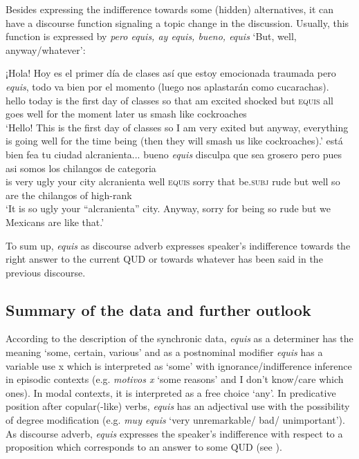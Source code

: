 \documentclass[output=paper]{langsci/langscibook}
\begin{document}
Besides expressing the indifference towards some (hidden) alternatives, it can have a discourse function signaling a topic change in the discussion. Usually, this function is expressed by \textit{pero equis, ay equis, bueno, equis} ‘But, well, anyway/whatever’:

\ea\label{ex:kellert:34}
\gll ¡Hola! Hoy es el primer día de clases así que estoy emocionada traumada pero \textit{equis}, todo va bien por el momento (luego nos aplastarán como cucarachas).\\
hello today is the first day of classes so that am excited shocked but \textsc{equis} all goes well for the moment later us smash like cockroaches\\
\glt ‘Hello! This is the first day of classes so I am very exited but anyway, everything is going well for the time being (then they will smash us like cockroaches).’
\ex 
\gll está bien fea tu ciudad alcranienta... bueno \textit{equis} disculpa que sea grosero pero pues asi somos los chilangos de categoria\\
is very ugly your city alcranienta well \textsc{equis} sorry that be.\textsc{subj} rude but well so are the chilangos of high-rank\\
\glt ‘It is so ugly your “alcranienta” city. Anyway, sorry for being so rude but we Mexicans are like that.’
\z

To sum up, \textit{equis} as discourse adverb expresses speaker’s indifference towards the right answer to the current QUD or towards whatever has been said in the previous discourse.

\subsection{Summary of the data and further outlook}\label{sec:kellert:2.5}
According to the description of the synchronic data, \textit{equis} as a determiner has the meaning ‘some, certain, various’ and as a postnominal modifier \textit{equis} has a variable use x which is interpreted as ‘some’ with ignorance/indifference inference in episodic contexts (e.g. \textit{motivos x} ‘some reasons’ and I don’t know/care which ones). In modal contexts, it is interpreted as a free choice ‘any’. In predicative position after copular(-like) verbs, \textit{equis} has an adjectival use with the possibility of degree modification (e.g. \textit{muy equis} ‘very unremarkable/ bad/ unimportant’). As discourse adverb, \textit{equis} expresses the speaker’s indifference with respect to a proposition which corresponds to an answer to some QUD (see ).
\end{document}

